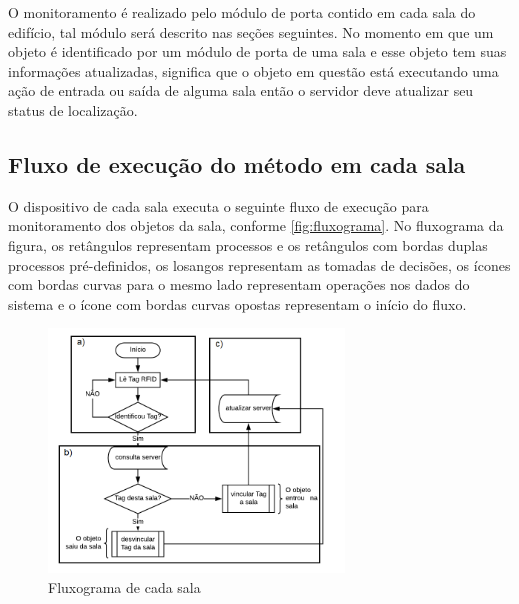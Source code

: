 O monitoramento é realizado pelo módulo de porta contido em cada sala do edifício, tal módulo será descrito nas seções seguintes. No momento em que um objeto é identificado por um módulo de porta de uma sala e esse objeto tem suas informações atualizadas, significa que o objeto em questão está executando uma ação de entrada ou saída de alguma sala então o servidor deve atualizar seu status de localização.


\subsection{Fluxo de execução do método em cada sala}

O dispositivo de cada sala executa o seguinte fluxo de execução para monitoramento dos objetos da sala, conforme \autoref{fig:fluxograma}. 
No fluxograma da figura, os retângulos representam processos e os retângulos com bordas duplas processos pré-definidos, os losangos representam as tomadas de decisões,
os ícones com bordas curvas para o mesmo lado representam operações nos dados do sistema e o ícone com bordas curvas
opostas representam o início do fluxo.

\begin{figure}[H]
              \caption{\label{fig:fluxograma}{Fluxograma de cada sala}}
              \centering
              \includegraphics[width=0.7\textwidth]{Figuras/fluxograma.png}
\end{figure}

